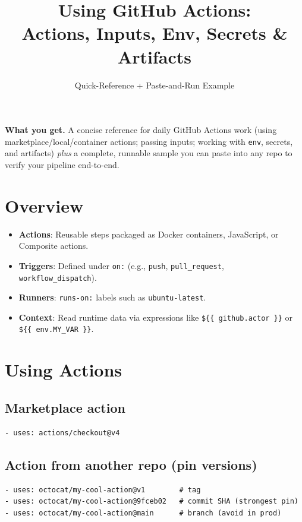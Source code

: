 \documentclass[11pt]{article}
\title{\textbf{Using GitHub Actions:}\\Actions, Inputs, Env, Secrets \& Artifacts}
\author{Quick-Reference + Paste-and-Run Example}
\date{}
\begin{document}
\maketitle
\vspace{-1.0em}

\noindent\textbf{What you get.} A concise reference for daily GitHub Actions work (using marketplace/local/container actions; passing inputs; working with \texttt{env}, secrets, and artifacts) \emph{plus} a complete, runnable sample you can paste into any repo to verify your pipeline end-to-end.

\section{Overview}
\begin{itemize}
  \item \textbf{Actions}: Reusable steps packaged as Docker containers, JavaScript, or Composite actions.
  \item \textbf{Triggers}: Defined under \texttt{on:} (e.g., \texttt{push}, \texttt{pull\_request}, \texttt{workflow\_dispatch}).
  \item \textbf{Runners}: \texttt{runs-on:} labels such as \texttt{ubuntu-latest}.
  \item \textbf{Context}: Read runtime data via expressions like \texttt{\$\{\{ github.actor \}\}} or \texttt{\$\{\{ env.MY\_VAR \}\}}.
\end{itemize}

\section{Using Actions}
\subsection{Marketplace action}
\begin{verbatim}
- uses: actions/checkout@v4
\end{verbatim}

\subsection{Action from another repo (pin versions)}
\begin{verbatim}
- uses: octocat/my-cool-action@v1        # tag
- uses: octocat/my-cool-action@9fceb02   # commit SHA (strongest pin)
- uses: octocat/my-cool-action@main      # branch (avoid in prod)
\end{verbatim}
\end{document}
